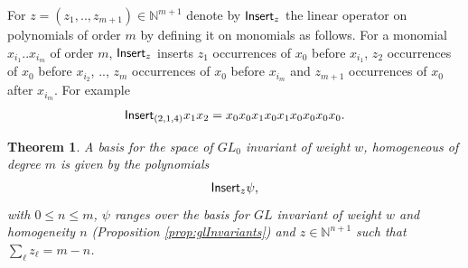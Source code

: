 \documentclass{scrartcl}
\newtheorem{theorem}{Theorem}
\theoremstyle{plain}
\theoremstyle{definition}
\newcommand{\N}{\mathbb{N}}
\newcommand{\1}[1]{1_{\{#1\}}}
\let\todon\todo
\newcommand{\todonotes}[1]{\todon{\color{red}#1}}
\renewcommand{\todo}[1]{ \textbf{\color{Orange}(#1)} }
\begin{document}
For $z = (z_1,..,z_{m+1}) \in \N^{m+1}$
denote by $\mathsf{Insert}_z$ the linear operator
on polynomials of order $m$ by defining it on monomials
as follows.
%
For a monomial $x_{i_1} .. x_{i_m}$ of order $m$,
$\mathsf{Insert}_z$ inserts
$z_1$ occurrences of $x_0$ before $x_{i_1}$,
$z_2$ occurrences of $x_0$ before $x_{i_2}$,
..,
$z_m$ occurrences of $x_0$ before $x_{i_m}$
and
$z_{m+1}$ occurrences of $x_0$ after $x_{i_m}$.
For example
\begin{align*}
  \mathsf{Insert}_{(2,1,4)} x_1 x_2 = x_0 x_0 x_1 x_0 x_1 x_0 x_0 x_0 x_0.
\end{align*}

\begin{theorem}
  A basis for
  the space of $GL_0$ invariant of weight $w$,
  homogeneous of degree $m$ is given by the polynomials
  \begin{align*}
    \mathsf{Insert}_z \psi,
  \end{align*}
  with $0 \le n \le m$,
  $\psi$ ranges over the basis for $GL$ invariant of weight $w$ and homogeneity $n$ (Proposition \ref{prop:glInvariants})
  and
  $z \in \N^{n+1}$ such that $\sum_\ell z_\ell = m - n$.
\end{theorem}
\end{document}
